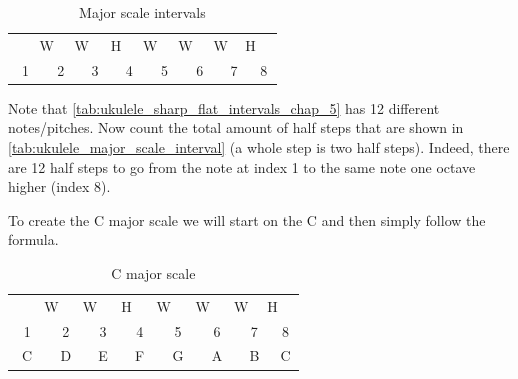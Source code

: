 \begin{table}[h]
	\centering
	\begin{tabular}{*{16}{c}}
		& \multicolumn{2}{P{4mm}}{\large{W}} & \multicolumn{2}{P{4mm}}{\large{W}} & \multicolumn{2}{P{4mm}}{\large{H}} & \multicolumn{2}{P{4mm}}{\large{W}} & \multicolumn{2}{P{4mm}}{\large{W}} & \multicolumn{2}{P{4mm}}{\large{W}} & \multicolumn{2}{P{4mm}}{\large{H}} & \\
		\multicolumn{2}{P{4mm}}{1} & \multicolumn{2}{P{4mm}}{2} & \multicolumn{2}{P{4mm}}{3} & \multicolumn{2}{P{4mm}}{4} & \multicolumn{2}{P{4mm}}{5} & \multicolumn{2}{P{4mm}}{6} & \multicolumn{2}{P{4mm}}{7} & \multicolumn{2}{P{4mm}}{8}
	\end{tabular}
	\caption{Major scale intervals}
	\label{tab:ukulele_major_scale_interval}
\end{table}

Note that \autoref{tab:ukulele_sharp_flat_intervals_chap_5} has 12 different notes/pitches. Now count the total amount of half steps that are shown in \autoref{tab:ukulele_major_scale_interval} (a whole step is two half steps). Indeed, there are 12 half steps to go from the note at index 1 to the same note one octave higher (index 8).

To create the C major scale we will start on the C and then simply follow the formula.

\begin{table}[h]
	\centering
	\begin{tabular}{*{16}{c}}
		& \multicolumn{2}{P{4mm}}{\large{W}} & \multicolumn{2}{P{4mm}}{\large{W}} & \multicolumn{2}{P{4mm}}{\large{H}} & \multicolumn{2}{P{4mm}}{\large{W}} & \multicolumn{2}{P{4mm}}{\large{W}} & \multicolumn{2}{P{4mm}}{\large{W}} & \multicolumn{2}{P{4mm}}{\large{H}} & \\
		\multicolumn{2}{P{4mm}}{1} & \multicolumn{2}{P{4mm}}{2} & \multicolumn{2}{P{4mm}}{3} & \multicolumn{2}{P{4mm}}{4} & \multicolumn{2}{P{4mm}}{5} & \multicolumn{2}{P{4mm}}{6} & \multicolumn{2}{P{4mm}}{7} & \multicolumn{2}{P{4mm}}{8} \\
		\multicolumn{2}{P{4mm}}{C} & \multicolumn{2}{P{4mm}}{D} & \multicolumn{2}{P{4mm}}{E} & \multicolumn{2}{P{4mm}}{F} & \multicolumn{2}{P{4mm}}{G} & \multicolumn{2}{P{4mm}}{A} & \multicolumn{2}{P{4mm}}{B} & \multicolumn{2}{P{4mm}}{C}
	\end{tabular}
	\caption{C major scale}
	\label{tab:ukulele_c_major_scale}
\end{table}

\newpage

